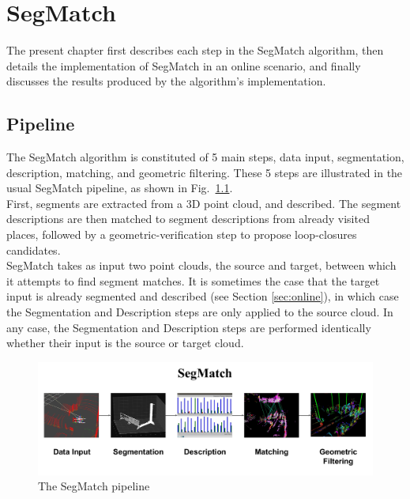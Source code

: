 \chapter{SegMatch}
\label{chap:segmatch}

The present chapter first describes each step in the SegMatch algorithm, then details the implementation of SegMatch in an online scenario, and finally discusses the results produced by the algorithm's implementation.

\section{Pipeline}
\label{sec:intro-pipeline}
The SegMatch algorithm is constituted of 5 main steps, data input, segmentation, description, matching, and geometric filtering. These 5 steps are illustrated in the usual SegMatch pipeline, as shown in Fig.~\ref{fig:pipeline}.\\

First, segments are extracted from a 3D point cloud, and described. The segment descriptions are then matched to segment descriptions from already visited places, followed by a geometric-verification step to propose loop-closures candidates.\\

SegMatch takes as input two point clouds, the source and target, between which it attempts to find segment matches.  
It is sometimes the case that the target input is already segmented and described (see Section \ref{sec:online}), in which case the Segmentation and Description steps are only applied to the source cloud.  
In any case, the Segmentation and Description steps are performed identically whether their input is the source or target cloud.\\


\begin{figure}
  \centering
  \includegraphics[width=5.2in]{images/pipeline.pdf}
  \caption{The SegMatch pipeline}
  \label{fig:pipeline}
\end{figure}


